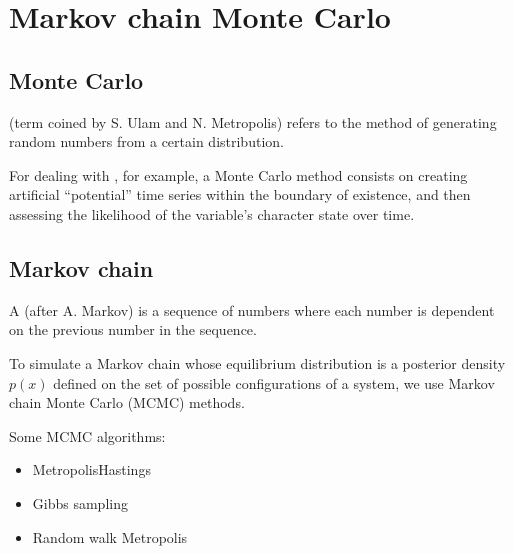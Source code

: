 \documentclass[a4paper,12pt,english]{sphinxhowto}
\begin{document}
\begin{quote}




{\hyperref[\detokenize{Time:edhrd}]{}}


\end{quote}




\section{Markov chain Monte Carlo}
\label{\detokenize{MCMC:markov-chain-monte-carlo}}\label{\detokenize{MCMC:mcmc}}\label{\detokenize{MCMC::doc}}

\subsection{Monte Carlo}
\label{\detokenize{MCMC:monte-carlo}}
 (term coined by S. Ulam and N. Metropolis) refers to the method of
generating random numbers from a certain distribution.

For dealing with {\hyperref[\detokenize{Uncertainty:uncertainty}]{}}, for example, a Monte Carlo method consists on
creating artificial “potential” time series within the boundary of existence, and then
assessing the likelihood of the variable’s character state over time.


\subsection{Markov chain}
\label{\detokenize{MCMC:markov-chain}}
A  (after A. Markov) is a sequence of numbers where each number is dependent on the previous
number in the sequence.

To simulate a Markov chain whose equilibrium distribution is a posterior density \(p(x)\) defined on
the set of possible configurations of a system, we use Markov chain Monte Carlo (MCMC) methods.

Some MCMC algorithms:
\begin{itemize}
\item {} 
Metropolis\sphinxhyphen{}Hastings

\item {} 
Gibbs sampling

\item {} 
Random walk Metropolis

\end{itemize}
\end{document}
